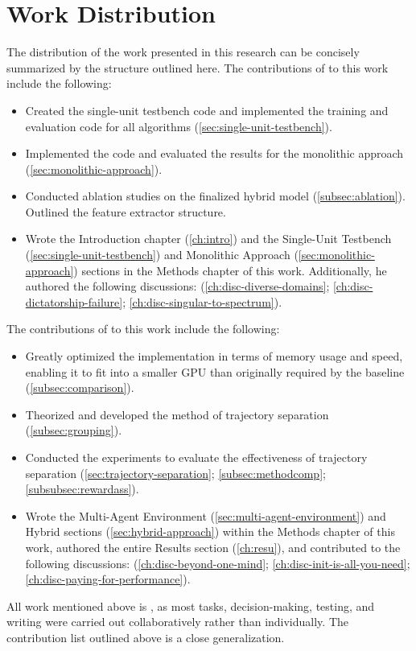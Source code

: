 \chapter{Work Distribution}
\label{appx:workdistrib}

\noindent The distribution of the work presented in this research can be concisely summarized by the structure outlined here. The contributions of  to this work include the following:

\begin{itemize}

\item Created the single-unit testbench code and implemented the training and evaluation code for all algorithms (\autoref{sec:single-unit-testbench}).

\item Implemented the code and evaluated the results for the monolithic approach (\autoref{sec:monolithic-approach}).

\item Conducted ablation studies on the finalized hybrid model (\autoref{subsec:ablation}). Outlined the feature extractor structure.

\item Wrote the Introduction chapter (\autoref{ch:intro}) and the Single-Unit Testbench (\autoref{sec:single-unit-testbench}) and Monolithic Approach (\autoref{sec:monolithic-approach}) sections in the Methods chapter of this work. Additionally, he authored the following discussions: (\autoref{ch:disc-diverse-domains}; \autoref{ch:disc-dictatorship-failure}; \autoref{ch:disc-singular-to-spectrum}).

\end{itemize}

\noindent The contributions of  to this work include the following:

\begin{itemize}

\item Greatly optimized the implementation in terms of memory usage and speed, enabling it to fit into a smaller GPU than originally required by the baseline (\autoref{subsec:comparison}).

\item Theorized and developed the method of trajectory separation (\autoref{subsec:grouping}).

\item Conducted the experiments to evaluate the effectiveness of trajectory separation (\autoref{sec:trajectory-separation}; \autoref{subsec:methodcomp}; \autoref{subsubsec:rewardass}). 

\item Wrote the Multi-Agent Environment (\autoref{sec:multi-agent-environment}) and Hybrid sections (\autoref{sec:hybrid-approach}) within the Methods chapter of this work, authored the entire Results section (\autoref{ch:resu}), and contributed to the following discussions: (\autoref{ch:disc-beyond-one-mind}; \autoref{ch:disc-init-is-all-you-need}; \autoref{ch:disc-paying-for-performance}).

\end{itemize}

\noindent All work mentioned above is , as most tasks, decision-making, testing, and writing were carried out collaboratively rather than individually. The contribution list outlined above is a close generalization.

